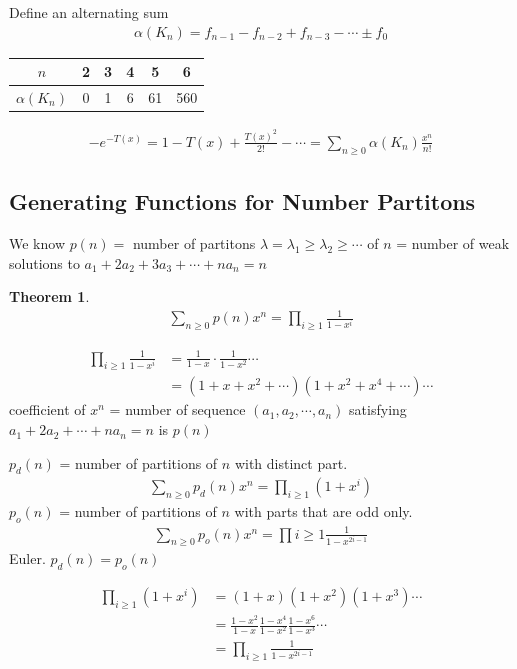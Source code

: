 \documentclass{article}
\theoremstyle{definition}
\newtheorem{thm}{Theorem}[]
\newenvironment{pf*}{\pushQED{\qed}\pf}{\popQED\endpf}
\begin{document}
Define an alternating sum 
\begin{align*}
    \alpha (K_n) = f_{n-1} - f_{n-2} + f_{n-3} - \cdots \pm f_0
\end{align*}
\begin{center}
    \begin{tabular}{c|ccccc}
        $n$ & 2 & 3 & 4 & 5 & 6 \\ 
        \hline 
        $\alpha(K_n)$ & 0 & 1 & 6 & 61 & 560
    \end{tabular}
\end{center}
\begin{align*}
    -e^{-T(x)} = 1 - T(x) + \frac{T(x)^2}{2!} - \cdots = \sum_{n\ge 0} 
    \alpha (K_n) \frac{x^n}{n!}
\end{align*}
\subsection{Generating Functions for Number Partitons}
We know $p(n) =$ number of partitons $\lambda = \lambda_1 \ge \lambda_2 
\ge \cdots$ of $n$ 
= number of weak solutions to $a_1 + 2a_2 +3a_3 + \cdots + n a_n = n$
\begin{thm}
    \begin{align*}
        \sum_{n \ge 0} p(n) x^n = \prod_{i \ge 1} \frac{1}{1-x^i} 
    \end{align*}
\end{thm}
\begin{pf*}
    \begin{align*}
        \prod_{i\ge 1} \frac{1}{1-x^i} &= \frac{1}{1-x} \cdot \frac{1}{1-x^2} \cdots \\ 
        &= (1+x+x^2+\cdots ) (1+ x^2 +x^4 + \cdots ) \cdots 
    \end{align*}
    coefficient of $x^n$ = number of sequence $(a_1, a_2, \cdots, a_n)$ 
    satisfying $a_1 + 2a_2 + \cdots + na_n = n$ is $p(n)$
\end{pf*}
$p_d (n)$ = number of partitions of $n$ with distinct part.
\begin{align*}
    \sum_{n\ge 0} p_d (n) x^n = \prod_{i \ge 1} (1+ x^i)
\end{align*}
$p_o (n)$ = number of partitions of $n$ with parts that are odd only. 
\begin{align*}
    \sum_{n \ge 0} p_o (n) x^n = \prod{i \ge 1} \frac{1}{1- x^{2i - 1}}
\end{align*}
Euler. $p_d (n) = p_o (n)$
\begin{pf*}
    \begin{align*}
        \prod_{i\ge 1 } (1+x^i) &= (1+x) (1+ x^2) ( 1+ x^3) \cdots \\ 
        &= \frac{1-x^2}{1-x} \frac{1-x^4}{1-x^2} \frac{1-x^6}{1-x^3} \cdots \\ 
        &= \prod_{i\ge 1} \frac{1}{1-x^{2i-1}} 
    \end{align*}
\end{pf*}
\end{document}
